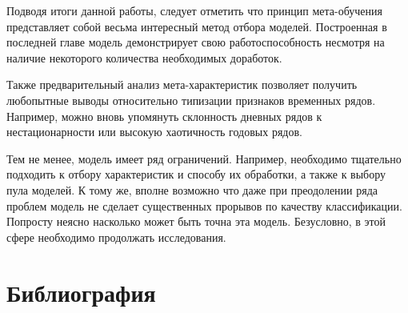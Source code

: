 \documentclass[a4paper,12pt]{article}
\begin{document}
Подводя итоги данной работы, следует отметить что принцип мета-обучения представляет собой весьма интересный метод отбора моделей. Построенная в последней главе модель демонстрирует свою работоспособность несмотря на наличие некоторого количества необходимых доработок.

Также предварительный анализ мета-характеристик позволяет получить любопытные выводы относительно типизации признаков временных рядов. Например, можно вновь упомянуть склонность дневных рядов к нестационарности или высокую хаотичность годовых рядов. 

Тем не менее, модель имеет ряд ограничений. Например, необходимо тщательно подходить к отбору характеристик и  способу их обработки, а также к выбору пула моделей. К тому же, вполне возможно что даже при преодолении ряда проблем модель не сделает существенных прорывов по качеству классификации. Попросту неясно насколько может быть точна эта модель. Безусловно, в этой сфере необходимо продолжать исследования.	

\newpage
\section{Библиография}
\end{document}
